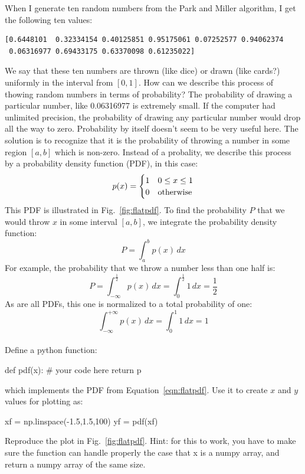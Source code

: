 {\noindent
When I generate ten random numbers from the Park and Miller algorithm, I get
the following ten values:
\begin{verbatim}
[0.6448101  0.32334154 0.40125851 0.95175061 0.07252577 0.94062374
 0.06316977 0.69433175 0.63370098 0.61235022]
\end{verbatim}
We say that these ten numbers are thrown (like dice) or drawn (like
cards?) uniformly in the interval from $[0,1]$.  How can we describe
this process of thowing random numbers in terms of probability?  The
probability of drawing a particular number, like 0.06316977 is
extremely small.  If the computer had unlimited precision, the
probability of drawing any particular number would drop all the way to
zero.  Probability by itself doesn't seem to be very useful here.  The
solution is to recognize that it is the probability of throwing a number in
some region $[a,b]$ which is non-zero.  Instead of a probality, we describe
this process by a probability density function (PDF), in this case:
\begin{equation}
  \label{eqn:flatpdf}
  p(x) =
  \begin{cases}
    1 & 0 \leq x \leq 1 \\
    0 & {\rm otherwise} \\
  \end{cases} 
\end{equation}
This PDF is illustrated in Fig.~\ref{fig:flatpdf}.  To find the probability $P$ that we would throw $x$ in some interval $[a,b]$, we integrate the probability density function:
\begin{displaymath}
  P = \int_a^b p(x) \, dx
\end{displaymath}
For example, the probability that we throw a number less than one half is:
\begin{displaymath}
  P = \int_{-\infty}^\frac{1}{2} p(x) \, dx = \int_{0}^\frac{1}{2} 1 \, dx = \frac{1}{2} 
\end{displaymath}
As are all PDFs, this one is normalized to a total probability of one:
\begin{displaymath}
  \int_{-\infty}^{+\infty} p(x) \, dx = \int_0^1 1 \, dx = 1
\end{displaymath}\\

\plot Define a python function:
\begin{python}
  def pdf(x):
      # your code here
      return p
\end{python}
which implements the PDF from Equation~\ref{eqn:flatpdf}.  Use it to create $x$ and $y$ values for plotting as:
\begin{python}
  xf = np.linspace(-1.5,1.5,100)
  yf = pdf(xf)
\end{python}
Reproduce the plot in Fig.~\ref{fig:flatpdf}.  Hint: for this to work,
you have to make sure the function  can handle properly
the case that x is a numpy array, and return a numpy array of the same
size.\\

}
